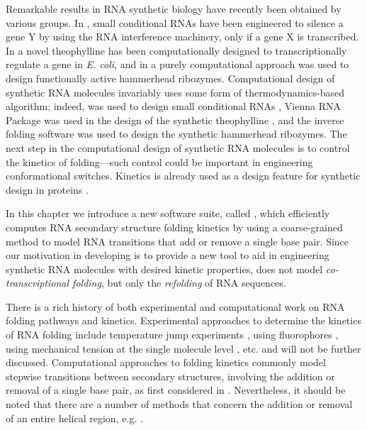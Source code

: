 \documentclass[11pt, oneside]{Thesis} %
\begin{document}
Remarkable results in RNA synthetic biology have recently been
obtained by various groups. In \citep{hochrein.jacs13}, small
conditional RNAs have been engineered to silence a gene Y by using the
RNA interference machinery, only if a gene X is transcribed. In
\citep{wachsmuth.nar13} a novel theophylline \rb has been
computationally designed to transcriptionally regulate a gene in
{\em E. coli}, and in \citep{synthetichammerheads} a purely computational
approach was used to design functionally active hammerhead ribozymes.
Computational design of synthetic RNA molecules invariably uses some
form of thermodynamics-based algorithm; indeed, 
\citep{zadeh.jcc11} was used to design small conditional RNAs
\citep{hochrein.jacs13}, Vienna RNA Package \citep{gruber08} was used in
the design of the synthetic theophylline \rb, and the
 inverse folding software
\citep{garcia.jbcbb13,garciamartin.nar13} was used to design the
synthetic hammerhead ribozymes. The next step in the computational
design of synthetic RNA molecules is to control the kinetics of
folding---such control could be important in engineering
conformational switches. Kinetics is already used as a design feature
for synthetic design in proteins \citep{bujotzek.jcam11,fasting.acie12}.

In this chapter we introduce a new software suite, called \hermes
\citep{senter:2015fq},
which efficiently computes RNA secondary structure
folding kinetics by using a coarse-grained
method to model RNA transitions that add or remove a single base pair.
Since our motivation in developing \hermes is to provide a new
tool to aid in engineering synthetic RNA molecules with desired
kinetic properties, \hermes does not model {\em co-transcriptional
folding}, but only the {\em refolding} of RNA sequences.

There is a rich history of both experimental and computational work on
RNA folding pathways and kinetics. Experimental approaches to
determine the kinetics of RNA folding include temperature jump
experiments \citep{lecuyercrothers}, using fluorophores
\citep{hobartner.jmb03}, using mechanical tension at the single
molecule level \citep{vieregg.mp06}, etc. and will not be further
discussed. Computational approaches to folding kinetics commonly model
stepwise transitions between secondary structures,
involving the addition or removal of a single base
pair, as first considered in \citep{flammhofacker}.
Nevertheless, it should be noted that there are a number of
methods that concern the addition or removal of an entire helical
region, e.g. \citep{huang.bb14,zhao.jcp11}.
\end{document}
